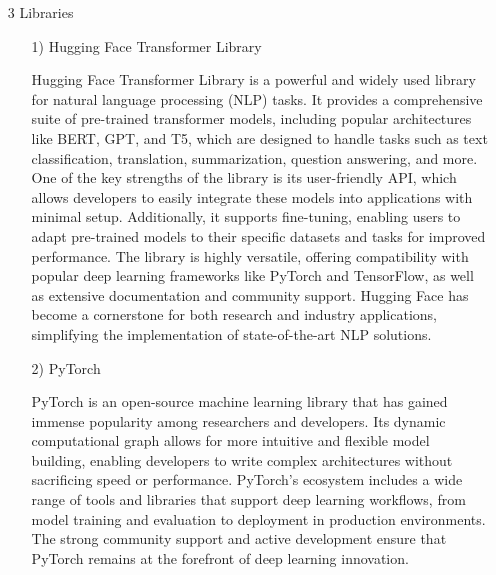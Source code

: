 \documentclass[conference]{IEEEtran}
\begin{document}
\begin{enumerate}
    \item[3] Libraries\par
    \vspace{0.3em}
    
    \begin{itemize}
        \item [1)] Hugging Face Transformer Library\par
        \vspace{0.3em}
        Hugging Face Transformer Library is a powerful and widely used library for natural language processing (NLP) tasks. It provides a comprehensive suite of pre-trained transformer models, including popular architectures like BERT, GPT, and T5, which are designed to handle tasks such as text classification, translation, summarization, question answering, and more. One of the key strengths of the library is its user-friendly API, which allows developers to easily integrate these models into applications with minimal setup. Additionally, it supports fine-tuning, enabling users to adapt pre-trained models to their specific datasets and tasks for improved performance. The library is highly versatile, offering compatibility with popular deep learning frameworks like PyTorch and TensorFlow, as well as extensive documentation and community support. Hugging Face has become a cornerstone for both research and industry applications, simplifying the implementation of state-of-the-art NLP solutions.

        \vspace{1em}

        \item [2)] PyTorch\par
        \vspace{0.3em}
        PyTorch is an open-source machine learning library that has gained immense popularity among researchers and developers. Its dynamic computational graph allows for more intuitive and flexible model building, enabling developers to write complex architectures without sacrificing speed or performance. PyTorch’s ecosystem includes a wide range of tools and libraries that support deep learning workflows, from model training and evaluation to deployment in production environments. The strong community support and active development ensure that PyTorch remains at the forefront of deep learning innovation.

        \vspace{1em}
        

\end{itemize}
\end{enumerate}
\end{document}
